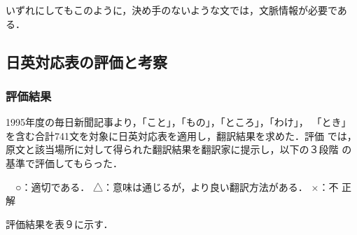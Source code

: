 いずれにしてもこのように，決め手のないような文では，文脈情報が必要である．

\vspace{1em}

\subsection{日英対応表の評価と考察}

\subsubsection{評価結果}

1995年度の毎日新聞記事より，「こと」，「もの」，「ところ」，「わけ」，
「とき」を含む合計741文を対象に日英対応表を適用し，翻訳結果を求めた．評価
では，原文と該当場所に対して得られた翻訳結果を翻訳家に提示し，以下の３段階
の基準で評価してもらった．

　○：適切である．  △：意味は通じるが，より良い翻訳方法がある． ×：不
正解

評価結果を表９に示す．

